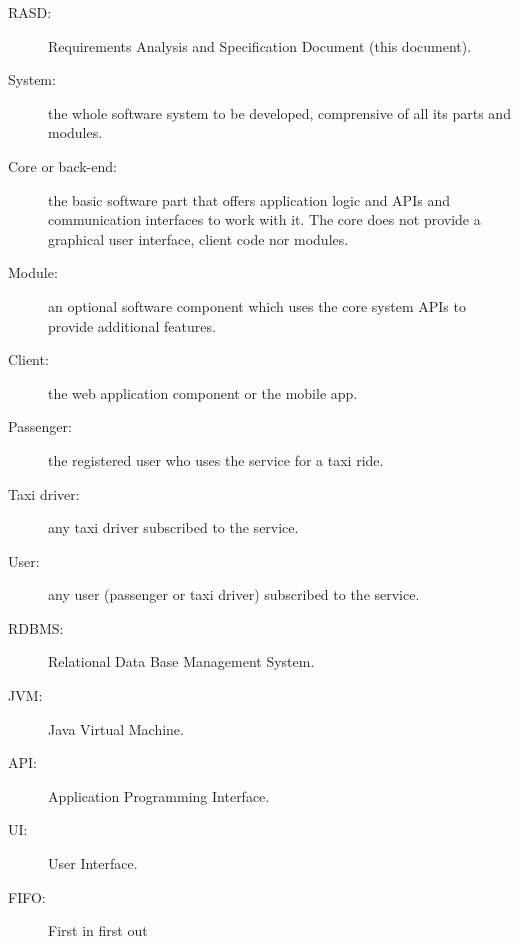 \begin{description}
\item[RASD:] Requirements Analysis and Specification Document (this document).
\item[System:] the whole software system to be developed, comprensive of all its parts and modules.
\item[Core or back-end:] the basic software part that offers application logic and APIs and communication interfaces to work with it. The core does not provide a graphical user interface, client code nor modules.
\item[Module:] an optional software component which uses the core system APIs to provide additional features.
\item[Client:] the web application component or the mobile app.
\item[Passenger:] the registered user who uses the service for a taxi ride.
\item[Taxi driver:] any taxi driver subscribed to the service.
\item[User:] any user (passenger or taxi driver) subscribed to the service.
\item[RDBMS:] Relational Data Base Management System.
\item[JVM:] Java Virtual Machine.
\item[API:] Application Programming Interface.
\item[UI:] User Interface.
\item[FIFO:] First in first out
\end{description}
